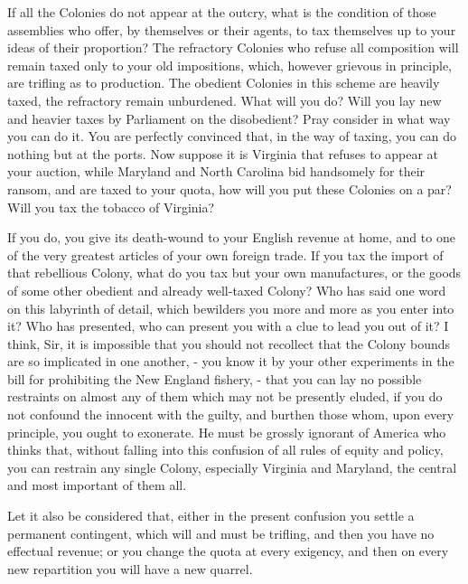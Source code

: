 If all the Colonies do not appear at the outcry, what is the condition of those assemblies who offer, by themselves or their agents, to tax themselves up to your ideas of their proportion? The refractory Colonies who refuse all composition will remain taxed only to your old impositions, which, however grievous in principle, are trifling as to production. The obedient Colonies in this scheme are heavily taxed, the refractory remain unburdened. What will you do? Will you lay new and heavier taxes by Parliament on the disobedient? Pray consider in what way you can do it. You are perfectly convinced that, in the way of taxing, you can do nothing but at the ports. Now suppose it is Virginia that refuses to appear at your auction, while Maryland and North Carolina bid handsomely for their ransom, and are taxed to your quota, how will you put these Colonies on a par? Will you tax the tobacco of Virginia?\par

If you do, you give its death-wound to your English revenue at home, and to one of the very greatest articles of your own foreign trade. If you tax the import of that rebellious Colony, what do you tax but your own manufactures, or the goods of some other obedient and already well-taxed Colony? Who has said one word on this labyrinth of detail, which bewilders you more and more as you enter into it? Who has presented, who can present you with a clue to lead you out of it? I think, Sir, it is impossible that you should not recollect that the Colony bounds are so implicated in one another, - you know it by your other experiments in the bill for prohibiting the New England fishery, - that you can lay no possible restraints on almost any of them which may not be presently eluded, if you do not confound the innocent with the guilty, and burthen those whom, upon every principle, you ought to exonerate. He must be grossly ignorant of America who thinks that, without falling into this confusion of all rules of equity and policy, you can restrain any single Colony, especially Virginia and Maryland, the central and most important of them all.\par

Let it also be considered that, either in the present confusion you settle a permanent contingent, which will and must be trifling, and then you have no effectual revenue; or you change the quota at every exigency, and then on every new repartition you will have a new quarrel.\par

